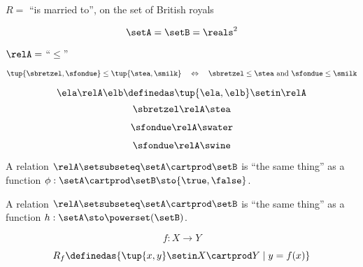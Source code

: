 {\begin{forslides}
        \begin{center}
            $R =$ ``is married to'', on the set of British royals \label{eq:slides-11a}
        \end{center}

        \begin{equation}
            \setA = \setB = \reals^2 \label{eq:slides-12}
        \end{equation}

        \begin{center}
            $\relA =$ ``$\leq$''  \label{eq:slides-13}
        \end{center}

        \begin{equation}
            \tup{\sbretzel, \sfondue} \leq \tup{\stea, \smilk} \quad \Leftrightarrow \quad \sbretzel \leq \stea \text{ and } \sfondue \leq \smilk \label{eq:slides-14}
        \end{equation}

        \begin{equation}
            \ela \relA \elb \definedas \tup{\ela, \elb} \setin \relA  \label{eq:slides-15}
        \end{equation}
        \begin{equation}
            \sbretzel \relA \stea \label{eq:slides-16}
        \end{equation}

        \begin{equation}
            \sfondue \relA \swater \label{eq:slides-17}
        \end{equation}

        \begin{equation}
            \sfondue \relA \swine \label{eq:slides-18}
        \end{equation}

        A relation $\relA \setsubseteq \setA \cartprod \setB$ is ``the same thing'' as a function $\phi : \setA \cartprod \setB \sto \{\true, \false\}$.

        A relation $\relA \setsubseteq \setA \cartprod \setB$ is ``the same thing'' as a function $h : \setA  \sto \powerset (\setB)$.

        \begin{equation}
            f : X \to Y
        \end{equation}

        \begin{equation}
            R_f \definedas \{ \tup{x, y} \setin X \cartprod Y \mid y = f(x) \}
        \end{equation}

    \end{forslides}
}

